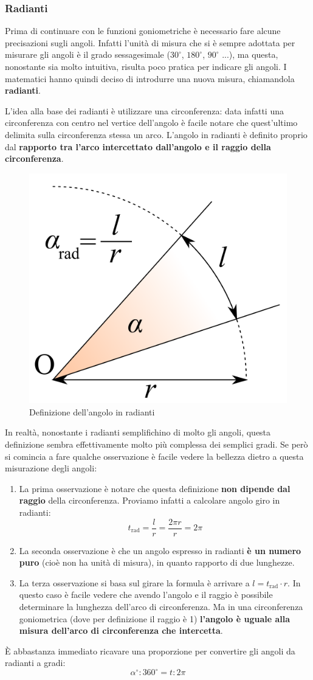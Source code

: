 \subsubsection{Radianti}
Prima di continuare con le funzioni goniometriche è necessario fare alcune precisazioni sugli angoli. Infatti l'unità di misura che si è sempre adottata per misurare gli angoli è il grado sessagesimale ($30^\circ$, $180^\circ$, $90^\circ$ ...), ma questa, nonostante sia molto intuitiva, risulta poco pratica per indicare gli angoli. I matematici hanno quindi deciso di introdurre una nuova misura, chiamandola \textbf{radianti}.

L'idea alla base dei radianti è utilizzare una circonferenza: data infatti una circonferenza con centro nel vertice dell'angolo è facile notare che quest'ultimo delimita sulla circonferenza stessa un arco. L'angolo in radianti è definito proprio dal \textbf{rapporto tra l'arco intercettato dall'angolo e il raggio della circonferenza}.
\begin{figure}[H]
    \centering
    \includegraphics[width=0.2\linewidth]{../img/radianti.png}
    \caption{Definizione dell'angolo in radianti}
\end{figure}

In realtà, nonostante i radianti semplifichino di molto gli angoli, questa definizione sembra effettivamente molto più complessa dei semplici gradi. Se però si comincia a fare qualche osservazione è facile vedere la bellezza dietro a questa misurazione degli angoli:
\begin{enumerate}
    \item La prima osservazione è notare che questa definizione \textbf{non dipende dal raggio} della circonferenza. Proviamo infatti a calcolare angolo giro in radianti:
        \begin{equation*}
            t_{\mathrm{rad}} = \dfrac{l}{r} = \dfrac{2\pi r}{r} = 2\pi
        \end{equation*}
        
    \item La seconda osservazione è che un angolo espresso in radianti \textbf{è un numero puro} (cioè non ha unità di misura), in quanto rapporto di due lunghezze.
    
    \item La terza osservazione si basa sul girare la formula è arrivare a $l = t_\mathrm{rad}\cdot r$. In questo caso è facile vedere che avendo l'angolo e il raggio è possibile determinare la lunghezza dell'arco di circonferenza. Ma in una circonferenza goniometrica (dove per definizione il raggio è 1) \textbf{l'angolo è uguale alla misura dell'arco di circonferenza che intercetta}.
\end{enumerate}
È abbastanza immediato ricavare una proporzione per convertire gli angoli da radianti a gradi:
\begin{equation*}
    \alpha^\circ : 360^\circ = t : 2\pi
\end{equation*}

